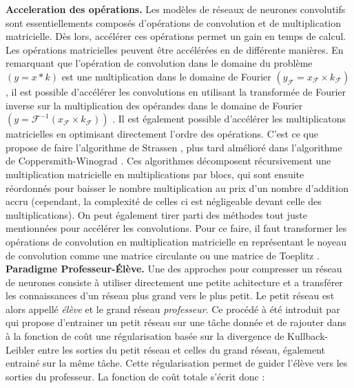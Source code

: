 \noindent \textbf{Acceleration des opérations.} Les modèles de réseaux de
neurones convolutifs sont essentiellements composés d'opérations de convolution
et de multiplication matricielle. Dès lors, accélérer ces opérations permet un
gain en temps de calcul. Les opérations matricielles peuvent être accélérées en
de différente manières. En remarquant que l'opération de convolution dans le
domaine du problème $(y = x * k)$ est une multiplication dans le domaine de
Fourier $(y_{\mathcal{F}} = x_{\mathcal{F}} \times k_{\mathcal{F}})$, il est
possible d'accélérer les convolutions en utilisant la transformée de Fourier
inverse sur la multiplication des opérandes dans le domaine de Fourier $(y =
  \mathcal{F}^{-1} (x_{\mathcal{F}} \times k_{\mathcal{F}}))$
\cite{DBLP:conf/nips/ChiJM20,DBLP:journals/npl/LinY19,DBLP:conf/pkdd/PrattWCZ17}.
Il est également possible d'accélérer les multiplicatons matricielles en
optimisant directement l'ordre des opérations. C'est ce que propose de faire
l'algorithme de Strassen \cite{strassen1969gaussian}, plus tard almélioré dans
l'algorithme de Coppersmith-Winograd \cite{coppersmith1987matrix}. Ces
algorithmes décomposent récursivement une multiplication matricielle en
multiplications par blocs, qui sont ensuite réordonnés pour baisser le nombre
multiplication au prix d'un nombre d'addition accru (cependant, la complexité de
celles ci est négligeable devant celle des multiplications). On peut également
tirer parti des méthodes tout juste mentionnées pour accélérer les convolutions.
Pour ce faire, il faut transformer les opérations de convolution en
multiplication matricielle en représentant le noyeau de convolution comme une
matrice circulante \cite{DBLP:conf/iccv/ChengYFKCC15} ou une matrice de Toeplitz
\cite{gray2006toeplitz,liao2019compressing}.\\

\noindent \textbf{Paradigme Professeur-Élève.} Une des approches pour compresser
un réseau de neurones consiste à utiliser directement une petite achitecture et
a transférer les connaissances d'un réseau plus grand vers le plus petit. Le
petit réseau est alors appellé \emph{élève} et le grand réseau
\emph{professeur}. Ce procédé à été introduit par
\cite{DBLP:journals/corr/HintonVD15} \cite{DBLP:journals/corr/HintonVD15} qui
propose d'entrainer un petit réseau sur une tâche donnée et de rajouter dans à
la fonction de coût une régularisation basée sur la divergence de
Kullback-Leibler entre les sorties du petit réseau et celles du grand réseau,
également entrainé sur la même tâche. Cette régularisation permet de guider
l'élève vers les sorties du professeur. La fonction de coût totale s'écrit donc
:\\

